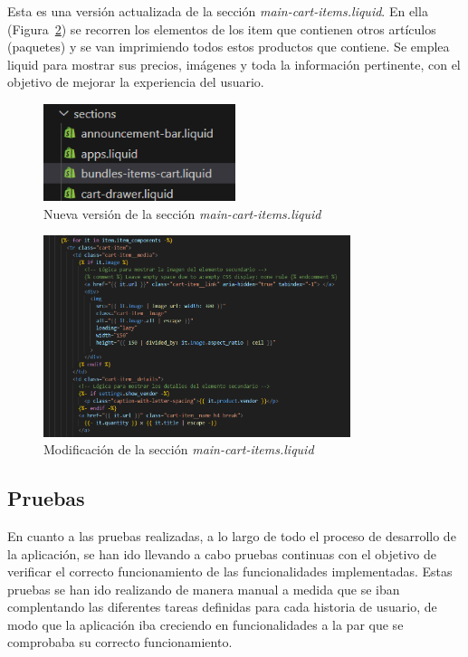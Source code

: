 \documentclass[12pt]{article}
\begin{document}
Esta es una versión actualizada de la sección \textit{main-cart-items.liquid}. En ella (Figura~\ref{fig:modificacionTema}) se recorren los 
elementos de los item que contienen otros artículos (paquetes) y se van imprimiendo todos estos productos que contiene. Se emplea liquid para mostrar sus precios, imágenes y toda la información pertinente,
con el objetivo de mejorar la experiencia del usuario.

\begin{figure}[ht]
    \centering
    \includegraphics[width=0.5\textwidth]{imagenes-tema/creacionSeccionTema.png}
    \caption{\label{fig:seccionTema} Nueva versión de la sección \textit{main-cart-items.liquid}} 
    \vspace{\fill}
\end{figure}

\begin{figure}[ht]
    \centering
    \includegraphics[width=0.8\textwidth]{imagenes-tema/modificaciondetema.png}
    \caption{\label{fig:modificacionTema} Modificación de la sección \textit{main-cart-items.liquid}} 
    \vspace{\fill}
\end{figure}


\clearpage
\subsection{Pruebas}
En cuanto a las pruebas realizadas, a lo largo de todo el proceso de desarrollo de la aplicación, se han ido llevando a cabo pruebas continuas
con el objetivo de verificar el correcto funcionamiento de las funcionalidades implementadas. Estas pruebas se han ido realizando de manera manual 
a medida que se iban complentando las diferentes tareas definidas para cada historia de usuario, de modo que la aplicación iba creciendo en funcionalidades 
a la par que se comprobaba su correcto funcionamiento.
\end{document}
